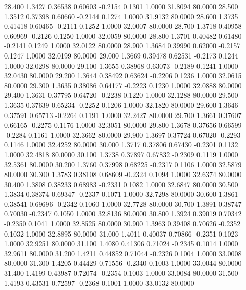   28.400   1.3427   0.36538   0.60603  -0.2154   0.1301   1.0000  31.8094  80.0000
  28.500   1.3512   0.37398   0.60660  -0.2144   0.1274   1.0000  31.9132  80.0000
  28.600   1.3735   0.41418   0.60465  -0.2111   0.1252   1.0000  32.0007  80.0000
  28.700   1.3718   0.40958   0.60969  -0.2126   0.1250   1.0000  32.0059  80.0000
  28.800   1.3701   0.40482   0.61480  -0.2141   0.1249   1.0000  32.0122  80.0000
  28.900   1.3684   0.39990   0.62000  -0.2157   0.1247   1.0000  32.0199  80.0000
  29.000   1.3669   0.39478   0.62531  -0.2173   0.1244   1.0000  32.0298  80.0000
  29.100   1.3655   0.38968   0.63073  -0.2189   0.1241   1.0000  32.0430  80.0000
  29.200   1.3644   0.38492   0.63624  -0.2206   0.1236   1.0000  32.0615  80.0000
  29.300   1.3635   0.38086   0.64177  -0.2223   0.1230   1.0000  32.0888  80.0000
  29.400   1.3631   0.37795   0.64720  -0.2238   0.1220   1.0000  32.1288  80.0000
  29.500   1.3635   0.37639   0.65234  -0.2252   0.1206   1.0000  32.1820  80.0000
  29.600   1.3646   0.37591   0.65713  -0.2264   0.1191   1.0000  32.2427  80.0000
  29.700   1.3661   0.37607   0.66165  -0.2275   0.1176   1.0000  32.3051  80.0000
  29.800   1.3678   0.37656   0.66599  -0.2284   0.1161   1.0000  32.3662  80.0000
  29.900   1.3697   0.37724   0.67020  -0.2293   0.1146   1.0000  32.4252  80.0000
  30.000   1.3717   0.37806   0.67430  -0.2301   0.1132   1.0000  32.4818  80.0000
  30.100   1.3738   0.37897   0.67832  -0.2309   0.1119   1.0000  32.5361  80.0000
  30.200   1.3760   0.37998   0.68225  -0.2317   0.1106   1.0000  32.5879  80.0000
  30.300   1.3783   0.38108   0.68609  -0.2324   0.1094   1.0000  32.6374  80.0000
  30.400   1.3808   0.38233   0.68983  -0.2331   0.1082   1.0000  32.6847  80.0000
  30.500   1.3834   0.38374   0.69347  -0.2337   0.1071   1.0000  32.7298  80.0000
  30.600   1.3861   0.38541   0.69696  -0.2342   0.1060   1.0000  32.7728  80.0000
  30.700   1.3891   0.38747   0.70030  -0.2347   0.1050   1.0000  32.8136  80.0000
  30.800   1.3924   0.39019   0.70342  -0.2350   0.1041   1.0000  32.8525  80.0000
  30.900   1.3963   0.39408   0.70626  -0.2352   0.1032   1.0000  32.8895  80.0000
  31.000   1.4011   0.40037   0.70866  -0.2351   0.1023   1.0000  32.9251  80.0000
  31.100   1.4080   0.41306   0.71024  -0.2345   0.1014   1.0000  32.9611  80.0000
  31.200   1.4211   0.44852   0.71044  -0.2326   0.1004   1.0000  33.0008  80.0000
  31.300   1.4205   0.44429   0.71556  -0.2340   0.1003   1.0000  33.0044  80.0000
  31.400   1.4199   0.43987   0.72074  -0.2354   0.1003   1.0000  33.0084  80.0000
  31.500   1.4193   0.43531   0.72597  -0.2368   0.1001   1.0000  33.0132  80.0000
